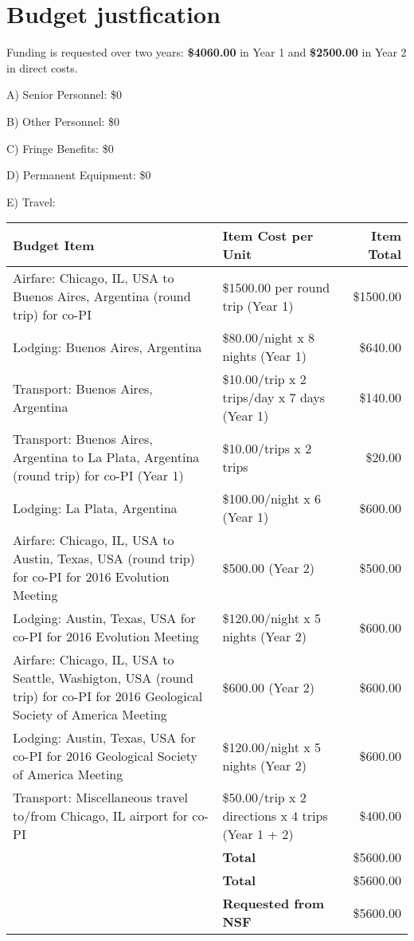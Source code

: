 \documentclass[11pt,letterpaper]{article}
\begin{document}
\setcounter{secnumdepth}{0}
\section{Budget justfication}

Funding is requested over two years: \textbf{\$4060.00} in Year 1 and \textbf{\$2500.00} in Year 2 in direct costs.

A) Senior Personnel: \$0

B) Other Personnel: \$0

C) Fringe Benefits: \$0

D) Permanent Equipment: \$0

E) Travel:

\begin{tabular}[H]{p{7.5cm} p{4.5cm} r}
  Budget Item & Item Cost per Unit & Item Total \\
  \hline
  Airfare: Chicago, IL, USA to Buenos Aires, Argentina (round trip) for co-PI & \$1500.00 per round trip (Year 1) & \$1500.00 \\
  Lodging: Buenos Aires, Argentina & \$80.00/night x 8 nights (Year 1) & \$640.00 \\
  Transport: Buenos Aires, Argentina & \$10.00/trip x 2 trips/day x 7 days (Year 1) & \$140.00 \\
  Transport: Buenos Aires, Argentina to La Plata, Argentina (round trip) for co-PI (Year 1) & \$10.00/trips x 2 trips & \$20.00 \\
  Lodging: La Plata, Argentina & \$100.00/night x 6 (Year 1) & \$600.00 \\
  Airfare: Chicago, IL, USA to Austin, Texas, USA (round trip) for co-PI for 2016 Evolution Meeting & \$500.00 (Year 2) & \$500.00 \\
  Lodging: Austin, Texas, USA for co-PI for 2016 Evolution Meeting & \$120.00/night x 5 nights (Year 2) & \$600.00 \\
  Airfare: Chicago, IL, USA to Seattle, Washigton, USA (round trip) for co-PI for 2016 Geological Society of America Meeting & \$600.00 (Year 2) & \$600.00 \\
  Lodging: Austin, Texas, USA for co-PI for 2016 Geological Society of America Meeting & \$120.00/night x 5 nights (Year 2) & \$600.00 \\
  Transport: Miscellaneous travel to/from Chicago, IL airport for co-PI & \$50.00/trip x 2 directions x 4 trips (Year 1 + 2) & \$400.00 \\
  & \textbf{Total} & \$5600.00 \\
  & \textbf{Total} & \$5600.00 \\
  & \textbf{Requested from NSF} & \$5600.00
\end{tabular}
\end{document}
